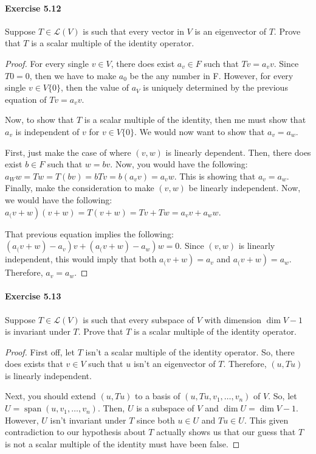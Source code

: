 \documentclass{article}
\theoremstyle{definition}
\begin{document}
\paragraph{Exercise 5.12} Suppose $T \in \mathcal{L}(V)$ is such that every vector in $V$ is an eigenvector of $T$. Prove that $T$ is a scalar multiple of the identity operator.
\begin{proof}
    For every single $v \in V$, there does exist $a_v \in F$ such that $T v=a_v v$. Since $T 0=0$, then we have to make $a_0$ be the any number in F. However, for every single $v \in V\{0\}$, then the value of $a_V$ is uniquely determined by the previous equation of $T v=a_v v$.

Now, to show that $T$ is a scalar multiple of the identity, then me must show that $a_v$ is independent of $v$ for $v \in V\{0\}$. We would now want to show that $a_v=a_w$.

First, just make the case of where $(v, w)$ is linearly dependent. Then, there does exist $b \in F$ such that $w=b v$. Now, you would have the following: $a_W w=T w=T(b v)=b T v=b\left(a_v v\right)=a_v w$. This is showing that $a_v=a_w$.
Finally, make the consideration to make $(v, w)$ be linearly independent. Now, we would have the following: $\left.a_{(} v+w\right)(v+w)=T(v+w)=T v+T w=a_v v+a_w w$.

That previous equation implies the following: $\left.\left.\left(a_{(} v+w\right)-a_v\right) v+\left(a_{(} v+w\right)-a_w\right) w=0$. Since $(v, w)$ is linearly independent, this would imply that both $\left.a_{(} v+w\right)=a_v$ and $\left.a_{(} v+w\right)=a_w$. Therefore, $a_v=a_w$.
\end{proof}



\paragraph{Exercise 5.13} Suppose $T \in \mathcal{L}(V)$ is such that every subspace of $V$ with dimension $\operatorname{dim} V-1$ is invariant under $T$. Prove that $T$ is a scalar multiple of the identity operator.
\begin{proof}
    First off, let $T$ isn't a scalar multiple of the identity operator. So, there does exists that $v \in V$ such that $u$ isn't an eigenvector of $T$. Therefore, $(u, T u)$ is linearly independent.

Next, you should extend $(u, T u)$ to a basis of $\left(u, T u, v_1, \ldots, v_n\right)$ of $V$. So, let $U=\operatorname{span}\left(u, v_1, \ldots, v_n\right)$. Then, $U$ is a subspace of $V$ and $\operatorname{dim} U=\operatorname{dim} V-1$. However, $U$ isn't invariant under $T$ since both $u \in U$ and $T u \in U$. This given contradiction to our hypothesis about $T$ actually shows us that our guess that $T$ is not a scalar multiple of the identity must have been false.
\end{proof}
\end{document}
